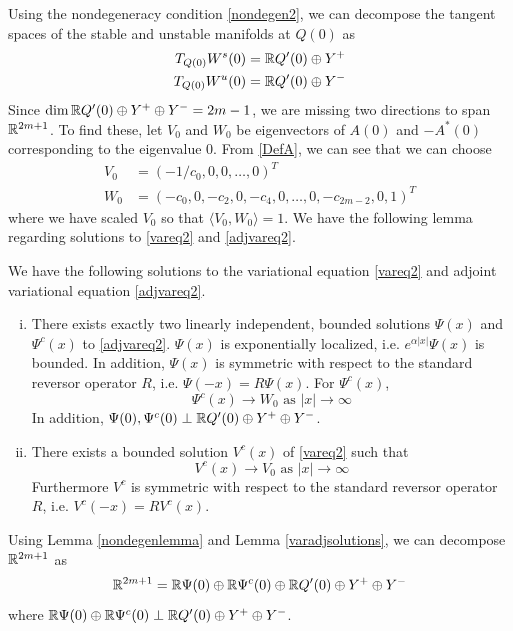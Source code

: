 \documentclass[thesis.tex]{subfiles}
\begin{document}
Using the nondegeneracy condition \eqref{nondegen2}, we can decompose the tangent spaces of the stable and unstable manifolds at $Q(0)$ as
\begin{align*}
T_{Q(0)}W^s(0) &= {\mathbb R} Q'(0) \oplus Y^+ \\
T_{Q(0)}W^u(0) &= {\mathbb R} Q'(0) \oplus Y^- \\
\end{align*}
Since $\dim {\mathbb R} Q'(0) \oplus Y^+ \oplus Y^- = 2m-1$, we are missing two directions to span ${\mathbb R}^{2m+1}$. To find these, let $V_0$ and $W_0$ be  eigenvectors of $A(0)$ and $-A^*(0)$ corresponding to the eigenvalue 0. From \eqref{DefA}, we can see that we can choose
\begin{align}
V_0 &= (-1/c_0, 0, 0, \dots, 0)^T \label{V0} \\
W_0 &= (-c_0, 0, -c_2, 0, -c_4, 0, \dots, 0, -c_{2m-2}, 0, 1)^T \label{W0}
\end{align}
where we have scaled $V_0$ so that $\langle V_0, W_0 \rangle = 1$. We have the following lemma regarding solutions to \eqref{vareq2} and \eqref{adjvareq2}.

\begin{lemma}\label{varadjsolutions}
We have the following solutions to the variational equation \eqref{vareq2} and adjoint variational equation \eqref{adjvareq2}.
\begin{enumerate}[(i)]
\item There exists exactly two linearly independent, bounded solutions $\Psi(x)$ and $\Psi^c(x)$ to \eqref{adjvareq2}. $\Psi(x)$ is exponentially localized, i.e. $e^{\alpha |x|}\Psi(x)$ is bounded. In addition, $\Psi(x)$ is symmetric with respect to the standard reversor operator $R$, i.e. $\Psi(-x) = R \Psi(x)$. For $\Psi^c(x)$,
	\begin{equation}
	\Psi^c(x) \rightarrow W_0 \text{ as }|x| \rightarrow \infty
	\end{equation}
In addition, $\Psi(0), \Psi^c(0) \perp {\mathbb R} Q'(0) \oplus Y^+ \oplus Y^-$.
\item There exists a bounded solution $V^c(x)$ of \eqref{vareq2} such that 
\begin{equation}
V^c(x) \rightarrow V_0 \text{ as }|x| \rightarrow \infty
\end{equation}
Furthermore $V^c$ is symmetric with respect to the standard reversor operator $R$, i.e. $V^c(-x) = R V^c(x)$.
\end{enumerate}
\end{lemma}

Using Lemma \ref{nondegenlemma} and Lemma \ref{varadjsolutions}, we can decompose ${\mathbb R}^{2m+1}$ as  
\begin{equation}
{\mathbb R}^{2m+1} = {\mathbb R} \Psi(0) \oplus {\mathbb R} \Psi^c(0) \oplus {\mathbb R} Q'(0) \oplus Y^+ \oplus Y^-
\end{equation}
where ${\mathbb R} \Psi(0) \oplus {\mathbb R} \Psi^c(0) \perp {\mathbb R} Q'(0) \oplus Y^+ \oplus Y^-$.
\end{document}
